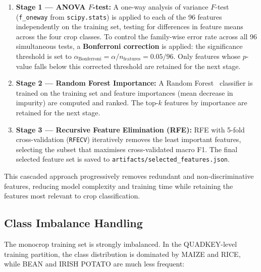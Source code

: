 \begin{enumerate}
    \item \textbf{Stage 1 — ANOVA $F$-test:} A one-way analysis of variance
          $F$-test (\texttt{f\_oneway} from \texttt{scipy.stats}) is applied
          to each of the 96 features independently on the training set,
          testing for differences in feature means across the four crop
          classes. To control the family-wise error rate across all 96
          simultaneous tests, a \textbf{Bonferroni correction} is applied:
          the significance threshold is set to
          $\alpha_{\mathrm{Bonferroni}} = \alpha / n_{\mathrm{features}} = 0.05 / 96$.
          Only features whose $p$-value falls below this corrected threshold
          are retained for the next stage.

    \item \textbf{Stage 2 — Random Forest Importance:} A Random
          Forest~\cite{breiman2001randomforest} classifier is trained on
          the training set and feature importances (mean decrease in
          impurity) are computed and ranked. The
          top-$k$ features by importance are retained for the next stage.

    \item \textbf{Stage 3 — Recursive Feature Elimination (RFE):} RFE
          with 5-fold cross-validation (\texttt{RFECV}) iteratively removes
          the least important features, selecting the subset that maximises
          cross-validated macro F1. The final selected feature set is saved
          to \texttt{artifacts/selected\_features.json}.
\end{enumerate}

This cascaded approach progressively removes redundant and non-discriminative
features, reducing model complexity and training time while retaining the
features most relevant to crop classification.


\subsection{Class Imbalance Handling}
\label{subsec:class_imbalance}

The monocrop training set is strongly imbalanced. In the QUADKEY-level
training partition, the class distribution is dominated by MAIZE and RICE,
while BEAN and IRISH POTATO are much less frequent:


